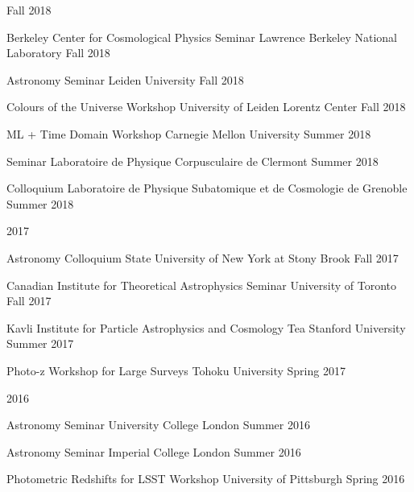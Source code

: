 \documentclass[11pt,letterpaper]{article}
\begin{document}
\begin{list}{}{\malzlist}
\begin{list}{}{\malzlist}
	{Fall 2018}
	\item {}
	{Berkeley Center for Cosmological Physics Seminar}
	{Lawrence Berkeley National Laboratory}
	{Fall 2018}
	\item {}
	{Astronomy Seminar}
	{Leiden University}
	{Fall 2018}
	\item {}
	{Colours of the Universe Workshop}
	{University of Leiden Lorentz Center}
	{Fall 2018}
	\item {}
	{ML + Time Domain Workshop}
	{Carnegie Mellon University}
	{Summer 2018}
	\item {}
	{Seminar}
	{Laboratoire de Physique Corpusculaire de Clermont}
	{Summer 2018}
	\item {}
	{Colloquium}
	{Laboratoire de Physique Subatomique et de Cosmologie de Grenoble}
	{Summer 2018}
\end{list}
\item 2017
\nopagebreak\begin{list}{}{\malzlist}
	\item {}
	{Astronomy Colloquium}
	{State University of New York at Stony Brook}
	{Fall 2017}
	\item {}
	{Canadian Institute for Theoretical Astrophysics Seminar}
	{University of Toronto}
	{Fall 2017}
	\item {}
	{Kavli Institute for Particle Astrophysics and Cosmology Tea}
	{Stanford University}
	{Summer 2017}
	\item {}
	{Photo-z Workshop for Large Surveys}
	{Tohoku University}
	{Spring 2017}
\end{list}
\item 2016
\nopagebreak\begin{list}{}{\malzlist}
	\item {}
	{Astronomy Seminar}
	{University College London}
	{Summer 2016}
	\item {}
	{Astronomy Seminar}
	{Imperial College London}
	{Summer 2016}
	\item {}
	{Photometric Redshifts for LSST Workshop}
	{University of Pittsburgh}
	{Spring 2016}
\end{list}
\end{list}
\end{document}
